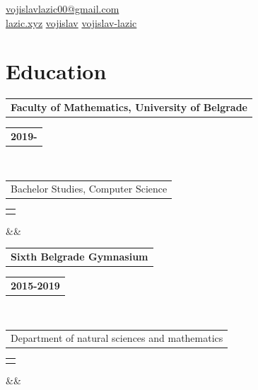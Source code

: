\documentclass[11pt,a4paper,roman]{moderncv}        %
\makeatletter
\newcommand*{\customcventry}[7][.25em]{
  \begin{tabular}{@{}l}
    {\bfseries #4}
  \end{tabular}
  \hfill%
  \begin{tabular}{l@{}}
     {\bfseries #5}
  \end{tabular} \\
  \begin{tabular}{@{}l}
    {#3}
  \end{tabular}
  \hfill%
  \begin{tabular}{l@{}}
     {\itshape #2}
  \end{tabular}
  \ifx&#7&%
  \else{\\%
    \begin{minipage}{\maincolumnwidth}%
      \small#7%
    \end{minipage}}\fi%
  \par\addvspace{#1}}
\makeatother
\begin{document}
\makecvtitle
\vspace*{-17mm}

\begin{center}
	\faEnvelope\enspace \href{mail:vojislavlazic00@gmail.com}{vojislavlazic00@gmail.com} \\
	\faGlobe\enspace \href{https://lazic.xyz}{lazic.xyz} \enspace
	\faGithub\enspace \href{https://github.com/vojislav}{vojislav} \enspace
	\faLinkedin\enspace \href{https://www.linkedin.com/in/vojislav-lazic/}{vojislav-lazic}
\end{center}

\section{Education}
{\customcventry{}{Bachelor Studies, Computer Science}{Faculty of Mathematics, University of Belgrade}{2019-}{}{}}
{\customcventry{}{Department of natural sciences and mathematics}{Sixth Belgrade Gymnasium}{2015-2019}{}{}}

\end{document}
